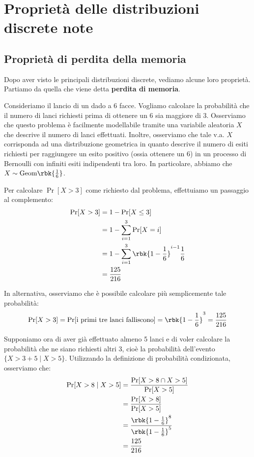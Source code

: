 \documentclass[a4paper, 12pt]{report}
\begin{document}
    \section{Proprietà delle distribuzioni discrete note}

    \subsection{Proprietà di perdita della memoria}

    Dopo aver visto le principali distribuzioni discrete, vediamo alcune loro proprietà. Partiamo da quella che viene detta \textbf{perdita di memoria}.
    
    Consideriamo il lancio di un dado a 6 facce. Vogliamo calcolare la probabilità che il numero di lanci richiesti prima di ottenere un 6 sia maggiore di 3. Osserviamo che questo problema è facilmente modellabile tramite una variabile aleatoria $X$ che descrive il numero di lanci effettuati. Inoltre, osserviamo che tale v.a. $X$ corrisponda ad una distribuzione geometrica in quanto descrive il numero di esiti richiesti per raggiungere un esito positivo (ossia ottenere un 6) in un processo di Bernoulli con infiniti esiti indipendenti tra loro. In particolare, abbiamo che $X \sim \mathrm{Geom}\rbk{\frac{1}{6}}$.

    Per calcolare $\Pr[X > 3]$ come richiesto dal problema, effettuiamo un passaggio al complemento:
    \[\begin{split}
        \Pr[X > 3] &= 1 - \Pr[X \leq 3] \\
        &= 1 - \sum_{i = 1}^{3} \Pr[X = i] \\
        &= 1 - \sum_{i = 1}^{3} \rbk{1-\frac{1}{6}}^{i-1} \frac{1}{6} \\
        &= \frac{125}{216} \\
    \end{split}\]

    In alternativa, osserviamo che è possibile calcolare più semplicemente tale probabilità:
    \[\Pr[X > 3] = \Pr[\text{i primi tre lanci falliscono}] = \rbk{1-\frac{1}{6}}^3 = \frac{125}{216}\]

    Supponiamo ora di aver già effettuato almeno 5 lanci e di voler calcolare la probabilità che ne siano richiesti altri 3, cioè la probabilità dell'evento $\{X > 3+5 \mid X > 5\}$. Utilizzando la definizione di probabilità condizionata, osserviamo che:
    \[\begin{split}
        \Pr[X > 8 \mid X > 5] &= \frac{\Pr[X > 8 \cap X > 5]}{\Pr[X > 5]} \\
        &= \frac{\Pr[X > 8]}{\Pr[X > 5]} \\
        &= \frac{\rbk{1-\frac{1}{6}}^8}{\rbk{1-\frac{1}{6}}^5} \\
        &= \frac{125}{216} \\
    \end{split}\]
\end{document}
